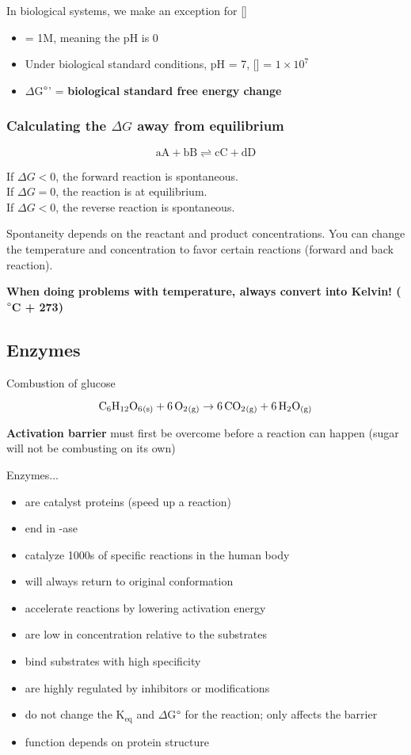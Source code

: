 \documentclass[letterpaper, 12pt]{article}
\begin{document}
In biological systems, we make an exception for []

\begin{itemize}
\item [\ce{H+}] = 1M, meaning the pH is 0
\item Under biological standard conditions, pH = 7, [] = $1 \times 10^7$
\item $\Delta$G$\degree$' = \textbf{biological standard free energy change}
\end{itemize}

\subsubsection*{Calculating the $\Delta G$ away from equilibrium}

$$ \text{aA} + \text{bB} \rightleftharpoons \text{cC} + \text{dD} $$

If $\Delta G < 0$, the forward reaction is spontaneous. \\
If $\Delta G = 0$, the reaction is at equilibrium. \\
If $\Delta G < 0$, the reverse reaction is spontaneous.

Spontaneity depends on the reactant and product concentrations. You can change the temperature and concentration to favor certain reactions (forward and back reaction).

\textbf{When doing problems with temperature, always convert into Kelvin! ($\degree$C + 273)}

\subsection*{Enzymes}

Combustion of glucose

$$\ce{C6H12O6_{(s)} + 6O2_{(g)}} \to \ce{6CO2_{(g)} + 6H2O_{(g)}}$$

\textbf{Activation barrier} must first be overcome before a reaction can happen (sugar will not be combusting on its own)

Enzymes...

\begin{itemize}
\item are catalyst proteins (speed up a reaction)
\item end in -ase
\item catalyze 1000s of specific reactions in the human body
\item will always return to original conformation
\item accelerate reactions by lowering activation energy
\item are low in concentration relative to the substrates
\item bind substrates with high specificity
\item are highly regulated by inhibitors or modifications
\item do not change the K$_\text{eq}$ and $\Delta$G$\degree$ for the reaction; only affects the barrier
\item function depends on protein structure
\end{itemize}
\end{document}
